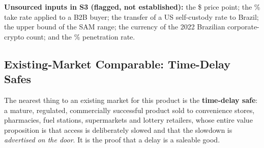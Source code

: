 \noindent\textbf{Unsourced inputs in S3 (flagged, not established):} the
\$\numint{\arpuSegThreeGrossMonthly} price point; the
\numint{\markPlatformFeePercent}\% take rate applied to a B2B buyer; the transfer of a
US self-custody rate to Brazil; the upper bound of the SAM range; the currency of the
2022 Brazilian corporate-crypto count; and the
\numint{\targetShareSegThree}\% penetration rate.

\subsection{Existing-Market Comparable: Time-Delay Safes}

The nearest thing to an existing market for this product is the \textbf{time-delay
safe}: a mature, regulated, commercially successful product sold to convenience
stores, pharmacies, fuel stations, supermarkets and lottery retailers, whose entire
value proposition is that access is deliberately slowed and that the slowdown is
\emph{advertised on the door}. It is the proof that a delay is a saleable good.

